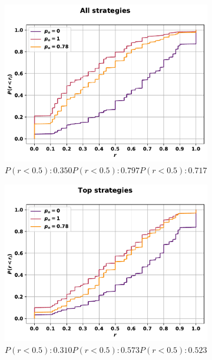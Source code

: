 \begin{figure}[!htbp]
    \begin{subfigure}{.45\textwidth}
    \includegraphics[width=\textwidth]{src/chapters/07/img/cfd_to_sequence_all_strategies.pdf}
    \caption{\(P(r<0.5): 0.350 P(r<0.5): 0.797 P(r<0.5): 0.717\)}
    \end{subfigure}\hfill
    \begin{subfigure}{.45\textwidth}
    \includegraphics[width=\textwidth]{src/chapters/07/img/cfd_to_sequence_top_strategies.pdf}
    \caption{\(P(r<0.5): 0.310 P(r<0.5): 0.573 P(r<0.5): 0.523\)}
    \end{subfigure}
    \begin{subfigure}{.45\textwidth}

\end{subfigure}
\end{figure}
